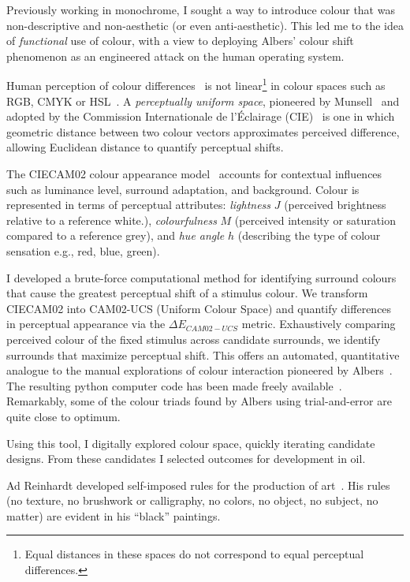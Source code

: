 \documentclass[12pt]{article}
\begin{document}
Previously working in monochrome, I sought a way to introduce
colour that was non-descriptive and non-aesthetic (or even
anti-aesthetic). This led me to the idea of \emph{functional} use of
colour, with a view to deploying Albers' colour shift phenomenon
as an engineered attack on the human operating system.

Human perception of colour differences~\cite{MacAdam1942} is not
linear\footnote{Equal distances in these spaces do not correspond to
  equal perceptual differences.} in colour spaces such as RGB, CMYK or
HSL~\cite{Luo2001CIECAM02}.  A \emph{perceptually uniform space},
pioneered by Munsell~\cite{Munsell1915} and adopted by the Commission
Internationale de l'\'{E}clairage
(CIE)~\cite{CIE1976,CIE1978Uniform,Luo2001CIEDE2000} is one in which
geometric distance between two colour vectors approximates perceived
difference, allowing Euclidean distance to quantify perceptual shifts.

The CIECAM02 colour appearance
model~\cite{Luo2001CIECAM02,CIE1592004} accounts for
contextual influences such as luminance level, surround adaptation,
and background. Colour is represented in terms of perceptual
attributes: \emph{lightness} $J$ (perceived brightness relative to a
reference white.), \emph{colourfulness} $M$ (perceived intensity or
saturation compared to a reference grey), and \emph{hue angle} $h$
(describing the type of colour sensation e.g., red, blue, green).

I developed a brute-force computational method for identifying
surround colours that cause the greatest perceptual shift of a
stimulus colour. We transform CIECAM02 into CAM02-UCS (Uniform Colour
Space) and quantify differences in perceptual appearance via the
$\Delta E_{CAM02-UCS}$ metric. Exhaustively comparing perceived colour
of the fixed stimulus across candidate surrounds, we identify
surrounds that maximize perceptual shift. This offers an automated,
quantitative analogue to the manual explorations of colour interaction
pioneered by Albers~\cite{albers}. The resulting python computer code
has been made freely
available~\cite{grant2025colourshift}. Remarkably, some of the colour
triads found by Albers using trial-and-error are quite close to
optimum.

Using this tool, I digitally explored colour space, quickly iterating
candidate designs. From these candidates I selected outcomes for
development in oil.

Ad Reinhardt developed self-imposed rules for the production of
art~\cite[p. 203-7]{artasart}. His rules (no texture, no brushwork
or calligraphy, no colors, no object, no subject, no matter) are
evident in his ``black'' paintings.
\end{document}
